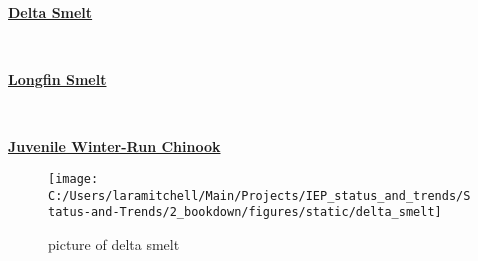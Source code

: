 \documentclass[
]{book}
\begin{document}
\begin{panel-grid}

\begin{columns-nocenter}

\begin{column800}

\textbf{\href{http://calfish.ucdavis.edu/species/?uid=47\&ds=698}{Delta Smelt}}

\end{column800}

\begin{column40}

~

\end{column40}

\begin{column800}

\textbf{\href{http://calfish.ucdavis.edu/species/?uid=87\&ds=698}{Longfin Smelt}}

\end{column800}

\begin{column40}

~

\end{column40}

\begin{column800}

\textbf{\href{http://calfish.ucdavis.edu/species/?uid=30\&ds=698}{Juvenile Winter-Run Chinook}}

\end{column800}

\end{columns-nocenter}

\begin{columns-nocenter}

\begin{column800}

\begin{figure}

{\centering \texttt{[image: C:/Users/laramitchell/Main/Projects/IEP\_status\_and\_trends/Status-and-Trends/2\_bookdown/figures/static/delta\_smelt]} 

}

\caption{picture of delta smelt}\label{fig:unnamed-chunk-40}
\end{figure}

\end{column800}

\begin{column40}


\end{column40}
\end{columns-nocenter}
\end{panel-grid}
\end{document}
